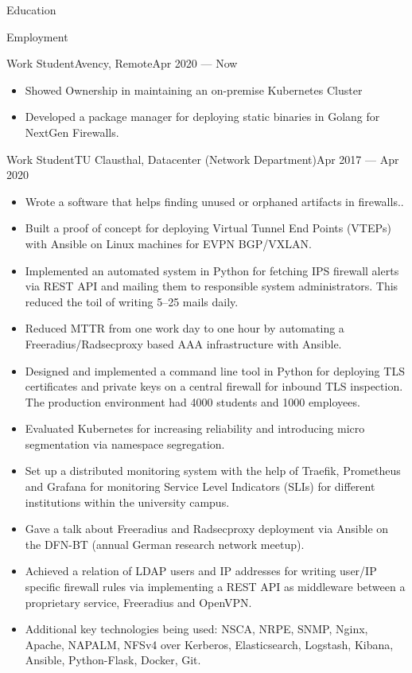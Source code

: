 \documentclass[]{mcdowellcv}
\begin{document}
\begin{cvsection}{Education}
\begin{cvsection}{Employment}
\begin{cvsubsection}{Work Student}{Avency, Remote}{Apr 2020 --- Now}
\begin{itemize}
\item Showed Ownership in maintaining an on-premise Kubernetes Cluster
\item Developed a package manager for deploying static binaries in Golang for NextGen Firewalls.
\end{itemize}
\end{cvsubsection}
\begin{cvsubsection}{Work Student}{TU Clausthal, Datacenter (Network Department)}{Apr 2017 --- Apr 2020}
\bigskip
\begin{itemize}
\item Wrote a software that helps finding unused or orphaned artifacts in firewalls..
\item Built a proof of concept for deploying Virtual Tunnel End Points (VTEPs) with Ansible on Linux machines for EVPN BGP/VXLAN.
\item Implemented an automated system in Python for fetching IPS firewall alerts via REST API and mailing them to responsible system administrators. This reduced the toil of writing 5--25 mails daily.
\item Reduced MTTR from one work day to one hour by automating a Freeradius/Radsecproxy based AAA infrastructure with Ansible.
\item Designed and implemented a command line tool in Python for deploying TLS certificates and private keys on a central firewall for inbound TLS inspection. The production environment had 4000 students and 1000 employees.
\item Evaluated Kubernetes for increasing reliability and introducing micro segmentation via namespace segregation.
\item Set up a distributed monitoring system with the help of Traefik, Prometheus and Grafana for monitoring Service Level Indicators (SLIs) for different institutions within the university campus.
\item Gave a talk about Freeradius and Radsecproxy deployment via Ansible on the DFN-BT (annual German research network meetup).
\item Achieved a relation of LDAP users and IP addresses for writing user/IP specific firewall rules via implementing a REST API as middleware between a proprietary service, Freeradius and OpenVPN.\@
\item Additional key technologies being used: NSCA, NRPE, SNMP, Nginx, Apache, NAPALM, NFSv4 over Kerberos, Elasticsearch, Logstash, Kibana, Ansible, Python-Flask, Docker, Git.
\end{itemize}
\end{cvsubsection}


\end{cvsection}
\end{cvsection}
\end{document}
